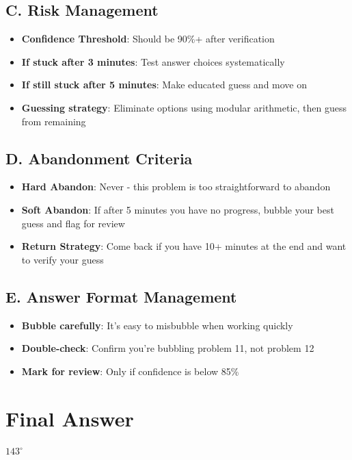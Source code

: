 \documentclass[]{article}
\begin{document}
\begin{competitionbox}
\subsection*{C. Risk Management}
\begin{itemize}[leftmargin=*]
    \item \textbf{Confidence Threshold}: Should be 90\%+ after verification
    \item \textbf{If stuck after 3 minutes}: Test answer choices systematically
    \item \textbf{If still stuck after 5 minutes}: Make educated guess and move on
    \item \textbf{Guessing strategy}: Eliminate options using modular arithmetic, then guess from remaining
\end{itemize}

\subsection*{D. Abandonment Criteria}
\begin{itemize}[leftmargin=*]
    \item \textbf{Hard Abandon}: Never - this problem is too straightforward to abandon
    \item \textbf{Soft Abandon}: If after 5 minutes you have no progress, bubble your best guess and flag for review
    \item \textbf{Return Strategy}: Come back if you have 10+ minutes at the end and want to verify your guess
\end{itemize}

\subsection*{E. Answer Format Management}
\begin{itemize}[leftmargin=*]
    \item \textbf{Bubble carefully}: It's easy to misbubble when working quickly
    \item \textbf{Double-check}: Confirm you're bubbling problem 11, not problem 12
    \item \textbf{Mark for review}: Only if confidence is below 85\%
\end{itemize}
\end{competitionbox}

\section*{Final Answer}
$\boxed{143^\circ}$
\end{document}
